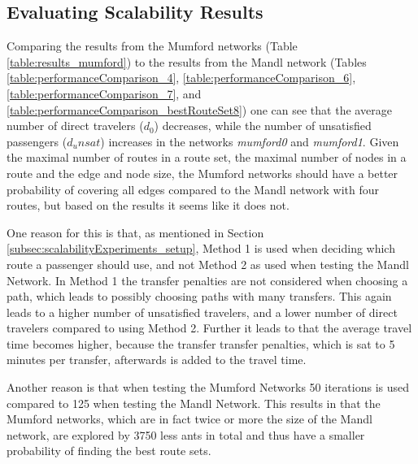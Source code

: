 \subsection{Evaluating Scalability Results}

Comparing the results from the Mumford networks (Table \vref{table:results_mumford}) to the results from the Mandl network (Tables \vref{table:performanceComparison_4}, \vref{table:performanceComparison_6}, \vref{table:performanceComparison_7}, and \vref{table:performanceComparison_bestRouteSet8}) one can see that the average number of direct travelers ($d_0$) decreases, while the number of unsatisfied passengers ($d_unsat$) increases in the networks \textit{mumford0} and \textit{mumford1}. Given the maximal number of routes in a route set, the maximal number of nodes in a route and the edge and node size, the Mumford networks should have a better probability of covering all edges compared to the Mandl network with four routes, but based on the results it seems like it does not. 

One reason for this is that, as mentioned in Section \vref{subsec:scalabilityExperiments_setup}, Method 1 is used when deciding which route a passenger should use, and not Method 2 as used when testing the Mandl Network. In Method 1 the transfer penalties are not considered when choosing a path, which leads to possibly choosing paths with many transfers. This again leads to a higher number of unsatisfied travelers, and a lower number of direct travelers compared to using Method 2. Further it leads to that the average travel time becomes higher, because the transfer transfer penalties, which is sat to 5 minutes per transfer, afterwards is added to the travel time. 

Another reason is that when testing the Mumford Networks 50 iterations is used compared to 125 when testing the Mandl Network. This results in that the Mumford networks, which are in fact twice or more the size of the Mandl network, are explored by 3750 less ants in total and thus have a smaller probability of finding the best route sets.  

